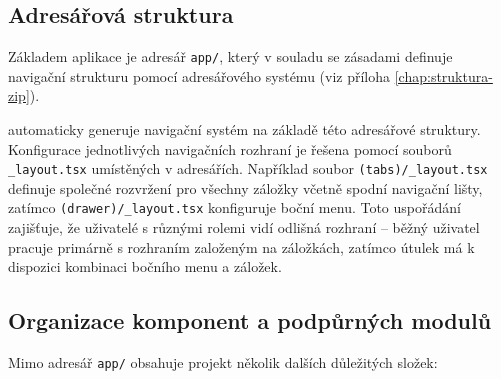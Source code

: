 \documentclass[czech, bp, kiv, he, iso690numb, pdf]{fasthesis}
\begin{document}
    \subsection{Adresářová struktura}

    Základem aplikace je adresář \texttt{app/}, který v souladu se zásadami  definuje navigační strukturu pomocí adresářového systému (viz příloha \ref{chap:struktura-zip}).


     automaticky generuje navigační systém na základě této adresářové struktury. Konfigurace jednotlivých navigačních rozhraní je řešena pomocí souborů \texttt{\_layout.tsx} umístěných v adresářích. Například soubor \texttt{(tabs)/\_layout.tsx} definuje společné rozvržení pro všechny záložky včetně spodní navigační lišty, zatímco \texttt{(drawer)/\_layout.tsx} konfiguruje boční menu. Toto uspořádání zajišťuje, že uživatelé s různými rolemi vidí odlišná rozhraní -- běžný uživatel pracuje primárně s rozhraním založeným na záložkách, zatímco útulek má k dispozici kombinaci bočního menu a záložek.

    \subsection{Organizace komponent a podpůrných modulů}

    Mimo adresář \texttt{app/} obsahuje projekt několik dalších důležitých složek:
\end{document}
